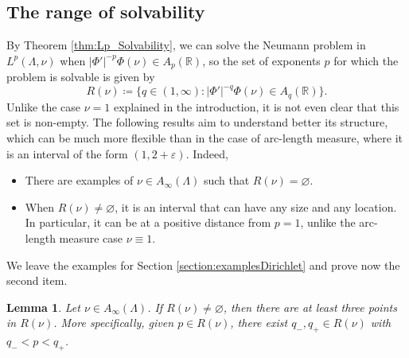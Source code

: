 \documentclass[12pt]{amsart}
\newcommand{\R}{\mathbb{R}}
\theoremstyle{plain}
\newtheorem{lemma}[theorem]{Lemma}
\theoremstyle{definition}
\numberwithin{equation}{section}
\begin{document}
\subsection{The range of solvability}


By Theorem \ref{thm:Lp_Solvability}, we can solve the Neumann problem in $L^p(\Lambda,\nu)$ when $|\Phi'|^{-p}\Phi(\nu)\in A_p(\R)$, so the set of exponents $p$ for which the problem is solvable is given by
\[
R(\nu)
\coloneqq 
\{
q\in (1,\infty):|\Phi'|^{-q}\Phi(\nu)\in A_q(\R)
\}.
\]
Unlike the case $\nu=1$ explained in the introduction, it is not even clear that this set is non-empty. The following results aim to understand better its structure, which can be much more flexible than in the case of arc-length measure, where it is an interval of the form $(1,2+\varepsilon)$. Indeed,
\begin{itemize}
    \item There are examples of $\nu\in A_{\infty}(\Lambda)$ such that $R(\nu)=\varnothing$.
    \item When $R(\nu)\neq\varnothing$,  it is an interval that can have any size and any location. In particular, it can be at a positive distance from $p=1$, unlike the arc-length measure case $\nu\equiv 1$. 
\end{itemize}

We leave the examples for Section \ref{section:examplesDirichlet} and prove now the second item. 


\begin{lemma}\label{lemma:lemma1RangeSolvability}
    Let $\nu\in A_{\infty}(\Lambda)$. If $R(\nu)\neq\varnothing$, then there are at least three points in $R(\nu)$. More specifically, given $p\in R(\nu)$, there exist $q_{-},q_{+}\in R(\nu)$ with $q_{-}<p<q_{+}$. 
\end{lemma}
\end{document}
